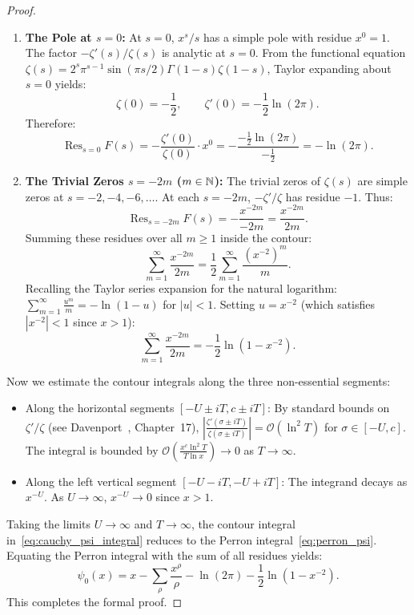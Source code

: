 \begin{proof}
\begin{enumerate}
  \item \textbf{The Pole at $s = 0$:}  
  At $s = 0$, $x^s / s$ has a simple pole with residue $x^0 = 1$. The factor $-\zeta'(s)/\zeta(s)$ is analytic at $s = 0$.
  From the functional equation $\zeta(s) = 2^s \pi^{s-1} \sin(\pi s / 2) \Gamma(1-s) \zeta(1-s)$, Taylor expanding about $s = 0$ yields:
  $$\zeta(0) = -\frac{1}{2}, \qquad \zeta'(0) = -\frac{1}{2}\ln(2\pi).$$
  Therefore:
  $$\operatorname{Res}_{s=0} F(s) = -\frac{\zeta'(0)}{\zeta(0)} \cdot x^0 = -\frac{-\frac{1}{2}\ln(2\pi)}{-\frac{1}{2}} = -\ln(2\pi).$$

  \item \textbf{The Trivial Zeros $s = -2m$ ($m \in \mathbb{N}$):}  
  The trivial zeros of $\zeta(s)$ are simple zeros at $s = -2, -4, -6, \dots$.
  At each $s = -2m$, $-\zeta'/\zeta$ has residue $-1$. Thus:
  $$\operatorname{Res}_{s = -2m} F(s) = - \frac{x^{-2m}}{-2m} = \frac{x^{-2m}}{2m}.$$
  Summing these residues over all $m \ge 1$ inside the contour:
  $$\sum_{m=1}^\infty \frac{x^{-2m}}{2m} = \frac{1}{2} \sum_{m=1}^\infty \frac{(x^{-2})^m}{m}.$$
  Recalling the Taylor series expansion for the natural logarithm: $\sum_{m=1}^\infty \frac{u^m}{m} = -\ln(1 - u)$ for $|u| < 1$.
  Setting $u = x^{-2}$ (which satisfies $|x^{-2}| < 1$ since $x > 1$):
  $$\sum_{m=1}^\infty \frac{x^{-2m}}{2m} = -\frac{1}{2}\ln\left(1 - x^{-2}\right).$$
\end{enumerate}

Now we estimate the contour integrals along the three non-essential segments:
\begin{itemize}
  \item Along the horizontal segments $[-U \pm i T, c \pm i T]$: By standard bounds on $\zeta'/\zeta$ (see Davenport~\cite{Davenport1980}, Chapter~17), $\left|\frac{\zeta'(\sigma \pm i T)}{\zeta(\sigma \pm i T)}\right| = \mathcal{O}(\ln^2 T)$ for $\sigma \in [-U, c]$. The integral is bounded by $\mathcal{O}\left(\frac{x^c \ln^2 T}{T \ln x}\right) \to 0$ as $T \to \infty$.
  \item Along the left vertical segment $[-U - i T, -U + i T]$: The integrand decays as $x^{-U}$. As $U \to \infty$, $x^{-U} \to 0$ since $x > 1$.
\end{itemize}
Taking the limits $U \to \infty$ and $T \to \infty$, the contour integral in~\eqref{eq:cauchy_psi_integral} reduces to the Perron integral~\eqref{eq:perron_psi}.
Equating the Perron integral with the sum of all residues yields:
$$\psi_0(x) = x - \sum_{\rho} \frac{x^\rho}{\rho} - \ln(2\pi) - \frac{1}{2}\ln\left(1 - x^{-2}\right).$$
This completes the formal proof.
\end{proof}

